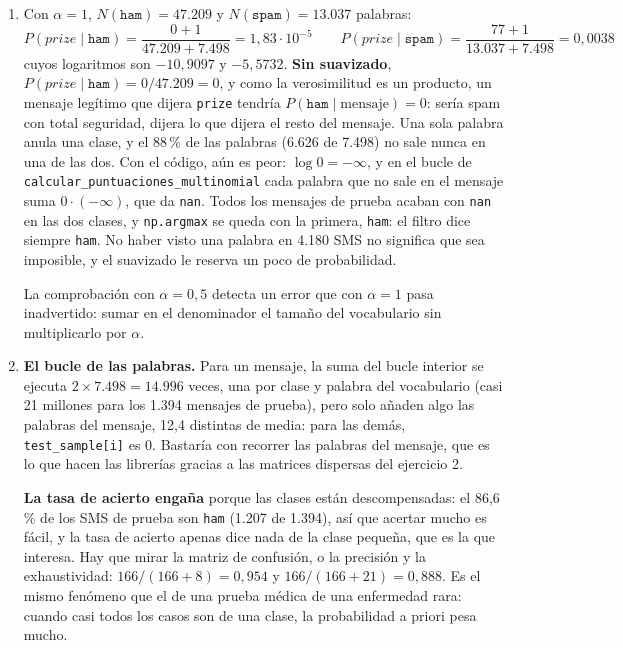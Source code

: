 \documentclass{article}
\begin{document}
\begin{enumerate}
    \item[a)] Con $\alpha = 1$, $N(\texttt{ham}) = 47.209$ y $N(\texttt{spam}) = 13.037$ palabras:
    \[
    P(\textit{prize} \mid \texttt{ham}) = \frac{0 + 1}{47.209 + 7.498} = 1{,}83 \cdot 10^{-5}
    \qquad
    P(\textit{prize} \mid \texttt{spam}) = \frac{77 + 1}{13.037 + 7.498} = 0{,}0038
    \]
    cuyos logaritmos son $-10{,}9097$ y $-5{,}5732$. \textbf{Sin suavizado}, $P(\textit{prize} \mid \texttt{ham}) = 0/47.209 = 0$, y como la verosimilitud es un producto, un mensaje legítimo que dijera \texttt{prize} tendría $P(\texttt{ham} \mid \text{mensaje}) = 0$: sería spam con total seguridad, dijera lo que dijera el resto del mensaje. Una sola palabra anula una clase, y el 88\,\% de las palabras (6.626 de 7.498) no sale nunca en una de las dos. Con el código, aún es peor: $\log 0 = -\infty$, y en el bucle de \texttt{calcular\_puntuaciones\_multinomial} cada palabra que no sale en el mensaje suma $0 \cdot (-\infty)$, que da \texttt{nan}. Todos los mensajes de prueba acaban con \texttt{nan} en las dos clases, y \texttt{np.argmax} se queda con la primera, \texttt{ham}: el filtro dice siempre \texttt{ham}. No haber visto una palabra en 4.180 SMS no significa que sea imposible, y el suavizado le reserva un poco de probabilidad.

    La comprobación con $\alpha = 0{,}5$ detecta un error que con $\alpha = 1$ pasa inadvertido: sumar en el denominador el tamaño del vocabulario sin multiplicarlo por $\alpha$.

    \item[b)] \textbf{El bucle de las palabras.} Para un mensaje, la suma del bucle interior se ejecuta $2 \times 7.498 = 14.996$ veces, una por clase y palabra del vocabulario (casi 21 millones para los 1.394 mensajes de prueba), pero solo añaden algo las palabras del mensaje, 12,4 distintas de media: para las demás, \texttt{test\_sample[i]} es 0. Bastaría con recorrer las palabras del mensaje, que es lo que hacen las librerías gracias a las matrices dispersas del ejercicio 2.

    \textbf{La tasa de acierto engaña} porque las clases están descompensadas: el 86,6\,\% de los SMS de prueba son \texttt{ham} (1.207 de 1.394), así que acertar mucho es fácil, y la tasa de acierto apenas dice nada de la clase pequeña, que es la que interesa. Hay que mirar la matriz de confusión, o la precisión y la exhaustividad: $166/(166 + 8) = 0{,}954$ y $166/(166 + 21) = 0{,}888$. Es el mismo fenómeno que el de una prueba médica de una enfermedad rara: cuando casi todos los casos son de una clase, la probabilidad a priori pesa mucho.


\end{enumerate}
\end{document}
